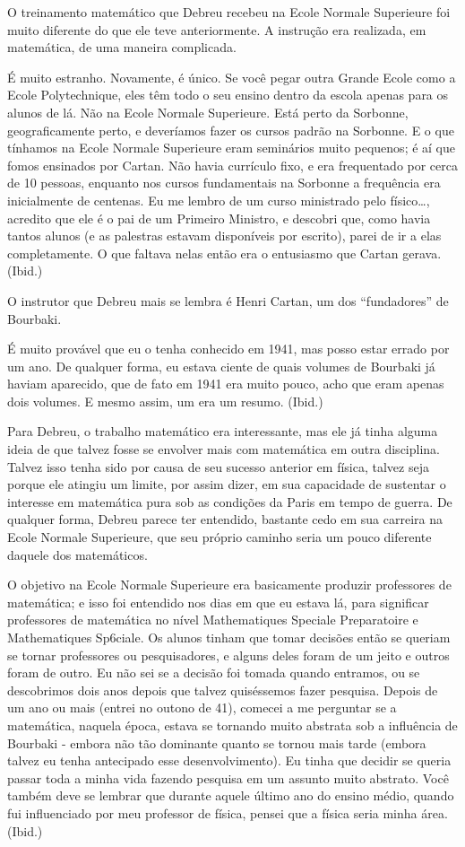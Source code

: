 \documentclass[a4paper,12pt]{article}[abntex2]
\begin{document}
O treinamento matemático que Debreu recebeu na Ecole Normale Superieure foi muito diferente do que ele teve anteriormente. A instrução era realizada, em matemática, de uma maneira complicada.

É muito estranho. Novamente, é único. Se você pegar outra Grande Ecole como a Ecole Polytechnique, eles têm todo o seu ensino dentro da escola apenas para os alunos de lá. Não na Ecole Normale Superieure. Está perto da Sorbonne, geograficamente perto, e deveríamos fazer os cursos padrão na Sorbonne. E o que tínhamos na Ecole Normale Superieure eram seminários muito pequenos; é aí que fomos ensinados por Cartan. Não havia currículo fixo, e era frequentado por cerca de 10 pessoas, enquanto nos cursos fundamentais na Sorbonne a frequência era inicialmente de centenas. Eu me lembro de um curso ministrado pelo físico…, acredito que ele é o pai de um Primeiro Ministro, e descobri que, como havia tantos alunos (e as palestras estavam disponíveis por escrito), parei de ir a elas completamente. O que faltava nelas então era o entusiasmo que Cartan gerava. (Ibid.)

O instrutor que Debreu mais se lembra é Henri Cartan, um dos “fundadores” de Bourbaki.

É muito provável que eu o tenha conhecido em 1941, mas posso estar errado por um ano. De qualquer forma, eu estava ciente de quais volumes de Bourbaki já haviam aparecido, que de fato em 1941 era muito pouco, acho que eram apenas dois volumes. E mesmo assim, um era um resumo. (Ibid.)

Para Debreu, o trabalho matemático era interessante, mas ele já tinha alguma ideia de que talvez fosse se envolver mais com matemática em outra disciplina. Talvez isso tenha sido por causa de seu sucesso anterior em física, talvez seja porque ele atingiu um limite, por assim dizer, em sua capacidade de sustentar o interesse em matemática pura sob as condições da Paris em tempo de guerra. De qualquer forma, Debreu parece ter entendido, bastante cedo em sua carreira na Ecole Normale Superieure, que seu próprio caminho seria um pouco diferente daquele dos matemáticos.

O objetivo na Ecole Normale Superieure era basicamente produzir professores de matemática; e isso foi entendido nos dias em que eu estava lá, para significar professores de matemática no nível Mathematiques Speciale Preparatoire e Mathematiques Sp6ciale. Os alunos tinham que tomar decisões então se queriam se tornar professores ou pesquisadores, e alguns deles foram de um jeito e outros foram de outro. Eu não sei se a decisão foi tomada quando entramos, ou se descobrimos dois anos depois que talvez quiséssemos fazer pesquisa. Depois de um ano ou mais (entrei no outono de 41), comecei a me perguntar se a matemática, naquela época, estava se tornando muito abstrata sob a influência de Bourbaki - embora não tão dominante quanto se tornou mais tarde (embora talvez eu tenha antecipado esse desenvolvimento). Eu tinha que decidir se queria passar toda a minha vida fazendo pesquisa em um assunto muito abstrato. Você também deve se lembrar que durante aquele último ano do ensino médio, quando fui influenciado por meu professor de física, pensei que a física seria minha área. (Ibid.)
\end{document}
